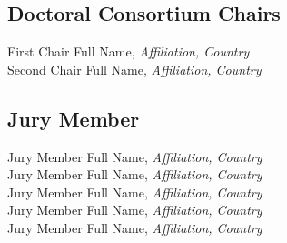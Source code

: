 
\subsection{Doctoral Consortium Chairs}
First Chair Full Name, \emph{Affiliation, Country}\\
Second Chair Full Name, \emph{Affiliation, Country}\\


\subsection{Jury Member}
Jury Member Full Name, \emph{Affiliation, Country}\\
Jury Member Full Name, \emph{Affiliation, Country}\\
Jury Member Full Name, \emph{Affiliation, Country}\\
Jury Member Full Name, \emph{Affiliation, Country}\\
Jury Member Full Name, \emph{Affiliation, Country}\\

